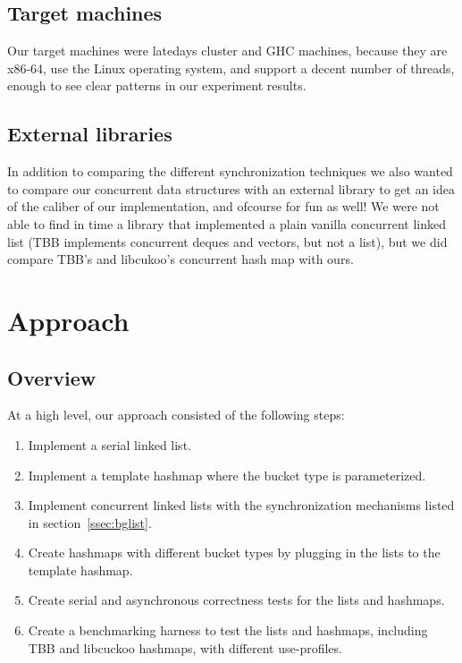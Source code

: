 \documentclass[11pt]{article}
\begin{document}
\subsection{Target machines}
Our target machines were latedays cluster and GHC machines, because they are
x86-64, use the Linux operating system, and support a decent number of threads,
enough to see clear patterns in our experiment results.


\subsection{External libraries}
In addition to comparing the different synchronization techniques we also wanted
to compare our concurrent data structures with an external library to get an
idea of the caliber of our implementation, and ofcourse for fun as well! We were
not able to find in time a library that implemented a plain vanilla concurrent
linked list (TBB implements concurrent deques and vectors, but not a list), but
we did compare TBB's and libcukoo's concurrent hash map with ours.


\section{Approach}

\subsection{Overview}
At a high level, our approach consisted of the following steps:
\begin{enumerate}
\item
Implement a serial linked list.
\item
Implement a template hashmap where the bucket type is parameterized.
\item
Implement concurrent linked lists with the synchronization mechanisms listed in
section~\ref{ssec:bglist}.
\item
Create hashmaps with different bucket types by plugging in the lists to the
template hashmap.
\item
Create serial and asynchronous correctness tests for the lists and hashmaps.
\item
Create a benchmarking harness to test the lists and hashmaps, including TBB and
libcuckoo hashmaps, with different use-profiles.
\end{enumerate}
\end{document}
